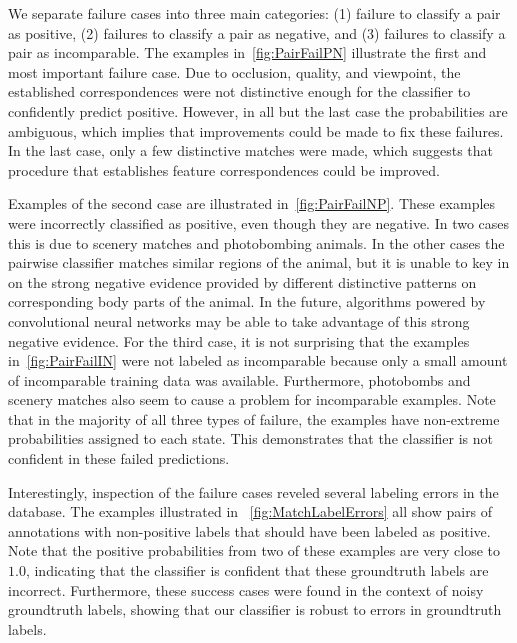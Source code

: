         We separate failure cases into three main categories:
        (1) failure to classify a pair as positive,
        (2) failures to classify a pair as negative, and
        (3) failures to classify a pair as incomparable.
        The examples in~\cref{fig:PairFailPN} illustrate the first and most important failure case.
        Due to occlusion, quality, and viewpoint, the established correspondences were not distinctive enough for
          the classifier to confidently predict positive.
        However, in all but the last case the probabilities are ambiguous, which implies that improvements could
          be made to fix these failures.
        In the last case, only a few distinctive matches were made, which suggests that procedure that
          establishes feature correspondences could be improved.

        Examples of the second case are illustrated in~\cref{fig:PairFailNP}.
        These examples were incorrectly classified as positive, even though they are negative.
        In two cases this is due to scenery matches and photobombing animals.
        In the other cases the pairwise classifier matches similar regions of the animal, but it is unable to key
          in on the strong negative evidence provided by different distinctive patterns on corresponding body parts
          of the animal.
        In the future, algorithms powered by convolutional neural networks may be able to take advantage of this
          strong negative evidence.
        For the third case, it is not surprising that the examples in~\cref{fig:PairFailIN} were not labeled as
          incomparable because only a small amount of incomparable training data was available.
        Furthermore, photobombs and scenery matches also seem to cause a problem for incomparable examples.
        Note that in the majority of all three types of failure, the examples have non-extreme probabilities
          assigned to each state.
        This demonstrates that the classifier is not confident in these failed predictions.

        Interestingly, inspection of the failure cases reveled several labeling errors in the database.
        The examples illustrated in ~\cref{fig:MatchLabelErrors} all show pairs of annotations with non-positive
          labels that should have been labeled as positive.
        Note that the positive probabilities from two of these examples are very close to $1.0$, indicating that
          the classifier is confident that these groundtruth labels are incorrect.
        Furthermore, these success cases were found in the context of noisy groundtruth labels, showing that our
          classifier is robust to errors in groundtruth labels.

